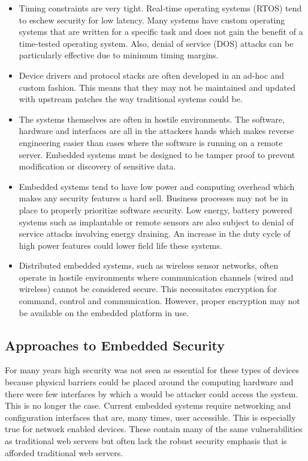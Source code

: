 \documentclass[final,conference,11pt]{IEEEtran}
\begin{document}
\begin{itemize}
\item 
Timing constraints are very tight.  Real-time operating systems (RTOS) tend to eschew security for low latency.  Many systems have custom operating systems that are written for a specific task and does not gain the benefit of a time-tested operating system.  Also, denial of service (DOS) attacks can be particularly effective due to minimum timing margins. \cite{Catal2011}
\item
Device drivers and protocol stacks are often developed in an ad-hoc and custom fashion.  This means that they may not be maintained and updated with upstream patches the way traditional systems could be.
\item 
The systems themselves are often in hostile environments. The software, hardware and interfaces are all in the attackers hands which makes reverse engineering easier than cases where the software is running on a remote server.  Embedded systems must be designed to be tamper proof to prevent modification or discovery of sensitive data.
\item 
Embedded systems tend to have low power and computing overhead which makes any security features a hard sell. Business processes may not be in place to properly prioritize software security.
Low energy, battery powered systems such as implantable or remote sensors are also subject to denial of service attacks involving energy draining.  An increase in the duty cycle of high power features could lower field life these systems. \cite{Vasserman2013}
\item 
Distributed embedded systems, such as wireless sensor networks, often operate in hostile environments where communication channels (wired and wireless) cannot be considered secure.  This necessitates encryption for command, control and communication. However, proper encryption may not be available on the embedded platform in use. \cite{Bojinov2010}
\end{itemize}

\subsection{Approaches to Embedded Security}

For many years high security was not seen as essential for these types of devices because physical barriers could be placed around the computing hardware and there were few interfaces by which a would be attacker could access the system.  This is no longer the case.  Current embedded systems require networking and configuration interfaces that are, many times, user accessible.  This is especially true for network enabled devices.  These contain many of the same vulnerabilities as traditional web servers but often lack the robust security emphasis that is afforded traditional web servers. \cite{Kumar2012}
\end{document}
